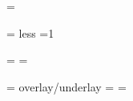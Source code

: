  
\privatize
{}
 
 
\newcount\fig@source
\newcount\fig@cap@pos
\newdimen\fig@cap@width
\newdimen\fig@cap@raise\fig@cap@raise=\z@%
\newcount\fig@orient
 
\newbox\fig@box                          %
\newbox\fig@cap@box                      %
\newtoks\fig@no                          %
\newtoks\fig@cap                         %
\newdimen\fig@inset    \fig@inset=\z@    %
\newdimen\fig@tuck     {}\cm  %
less
\newtoks\fig@scale     \fig@scale={1}    %
 
\newtoks\fig@eps                         %
\newdimen\fig@width    \fig@width=\z@    %
\newdimen\fig@height   \fig@height=\z@   %
 
\newcount\fig@lay      \fig@lay=\z@      %
overlay/underlay
\newtoks\x@fig@eps                       %
\newdimen\x@fig@width  \x@fig@width=\z@  %
\newdimen\x@fig@height \x@fig@height=\z@ %
 
\newif\if@ps@          \@ps@false        %
 
